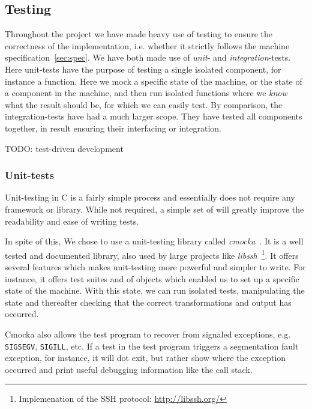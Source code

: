 \subsection{Testing}

Throughout the project we have made heavy use of testing to ensure the
correctness of the implementation, i.e. whether it strictly follows the machine
specification~\ref{sec:spec}. We have both made use of {\it unit}- and {\it
  integration}-tests. Here unit-tests have the purpose of testing a single
isolated component, for instance a function. Here we mock a specific state of
the machine, or the state of a component in the machine, and then run isolated
functions where we {\it know} what the result should be, for which we can easily
test. By comparison, the integration-tests have had a much larger scope. They
have tested all components together, in result ensuring their interfacing or
integration.

TODO: test-driven development

\subsubsection{Unit-tests}
Unit-testing in C is a fairly simple process and essentially does not require
any framework or library. While not required, a simple set of  will
greatly improve the readability and ease of writing tests.

In spite of this, We chose to use a unit-testing library called {\it
  cmocka}~\cite{cmocka}. It is a well tested and documented library, also used
by large projects like {\it libssh}~\footnote{Implemenation of the SSH protocol:
  \url{http://libssh.org/}}. It offers several features which makes unit-testing
more powerful and simpler to write. For instance, it offers test suites and
 of objects which enabled us to set up a specific state of the
machine. With this state, we can run isolated tests, manipulating the state and
thereafter checking that the correct transformations and output has occurred.

Cmocka also allows the test program to recover from signaled exceptions,
e.g. {\tt SIGSEGV}, {\tt SIGILL}, etc. If a test in the test program triggers a
segmentation fault exception, for instance, it will dot exit, but rather show
where the exception occurred and print useful debugging information like the
call stack.


